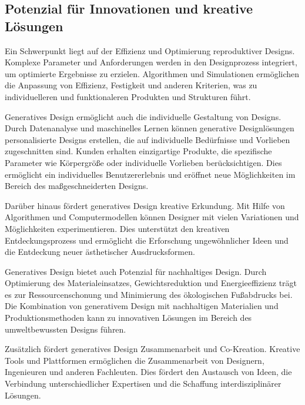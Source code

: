  \subsection*{Potenzial für Innovationen und kreative Lösungen}
 Ein Schwerpunkt liegt auf der Effizienz und Optimierung reproduktiver Designs. Komplexe Parameter und Anforderungen werden in den Designprozess integriert, um optimierte Ergebnisse zu erzielen. Algorithmen und Simulationen ermöglichen die Anpassung von Effizienz, Festigkeit und anderen Kriterien, was zu individuelleren und funktionaleren Produkten und Strukturen führt.

 Generatives Design ermöglicht auch die individuelle Gestaltung von Designs. Durch Datenanalyse und maschinelles Lernen können generative Designlösungen personalisierte Designs erstellen, die auf individuelle Bedürfnisse und Vorlieben zugeschnitten sind. Kunden erhalten einzigartige Produkte, die spezifische Parameter wie Körpergröße oder individuelle Vorlieben berücksichtigen. Dies ermöglicht ein individuelles Benutzererlebnis und eröffnet neue Möglichkeiten im Bereich des maßgeschneiderten Designs.
 
 Darüber hinaus fördert generatives Design kreative Erkundung. Mit Hilfe von Algorithmen und Computermodellen können Designer mit vielen Variationen und Möglichkeiten experimentieren. Dies unterstützt den kreativen Entdeckungsprozess und ermöglicht die Erforschung ungewöhnlicher Ideen und die Entdeckung neuer ästhetischer Ausdrucksformen.
 
 Generatives Design bietet auch Potenzial für nachhaltiges Design. Durch Optimierung des Materialeinsatzes, Gewichtsreduktion und Energieeffizienz trägt es zur Ressourcenschonung und Minimierung des ökologischen Fußabdrucks bei. Die Kombination von generativem Design mit nachhaltigen Materialien und Produktionsmethoden kann zu innovativen Lösungen im Bereich des umweltbewussten Designs führen.
 
 Zusätzlich fördert generatives Design Zusammenarbeit und Co-Kreation. Kreative Tools und Plattformen ermöglichen die Zusammenarbeit von Designern, Ingenieuren und anderen Fachleuten. Dies fördert den Austausch von Ideen, die Verbindung unterschiedlicher Expertisen und die Schaffung interdisziplinärer Lösungen.